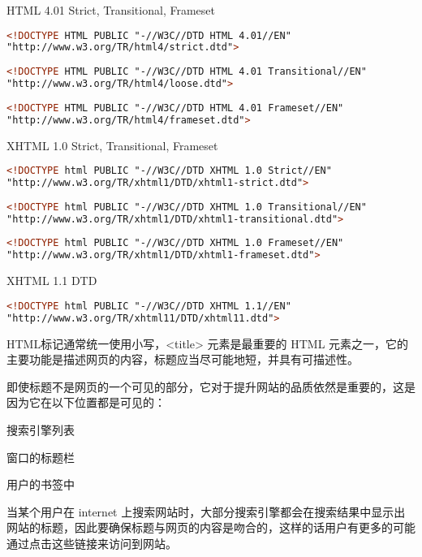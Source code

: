 \begin{compactenum}
\item HTML 4.01 Strict, Transitional, Frameset

\begin{lstlisting}[language=HTML]
<!DOCTYPE HTML PUBLIC "-//W3C//DTD HTML 4.01//EN"
"http://www.w3.org/TR/html4/strict.dtd">
	
<!DOCTYPE HTML PUBLIC "-//W3C//DTD HTML 4.01 Transitional//EN"
"http://www.w3.org/TR/html4/loose.dtd">
	
<!DOCTYPE HTML PUBLIC "-//W3C//DTD HTML 4.01 Frameset//EN"
"http://www.w3.org/TR/html4/frameset.dtd">
\end{lstlisting}

\item XHTML 1.0 Strict, Transitional, Frameset

\begin{lstlisting}[language=HTML]
<!DOCTYPE html PUBLIC "-//W3C//DTD XHTML 1.0 Strict//EN"
"http://www.w3.org/TR/xhtml1/DTD/xhtml1-strict.dtd">
	
<!DOCTYPE html PUBLIC "-//W3C//DTD XHTML 1.0 Transitional//EN"
"http://www.w3.org/TR/xhtml1/DTD/xhtml1-transitional.dtd">
	
<!DOCTYPE html PUBLIC "-//W3C//DTD XHTML 1.0 Frameset//EN"
"http://www.w3.org/TR/xhtml1/DTD/xhtml1-frameset.dtd">
\end{lstlisting}

\item XHTML 1.1 DTD

\begin{lstlisting}[language=HTML]
<!DOCTYPE html PUBLIC "-//W3C//DTD XHTML 1.1//EN" 
"http://www.w3.org/TR/xhtml11/DTD/xhtml11.dtd">
\end{lstlisting}

\end{compactenum}

HTML标记通常统一使用小写，<title> 元素是最重要的 HTML 元素之一，它的主要功能是描述网页的内容，标题应当尽可能地短，并具有可描述性。

即使标题不是网页的一个可见的部分，它对于提升网站的品质依然是重要的，这是因为它在以下位置都是可见的：

\begin{compactitem}
\item 搜索引擎列表
\item 窗口的标题栏
\item 用户的书签中
\end{compactitem}

当某个用户在 internet 上搜索网站时，大部分搜索引擎都会在搜索结果中显示出网站的标题，因此要确保标题与网页的内容是吻合的，这样的话用户有更多的可能通过点击这些链接来访问到网站。


